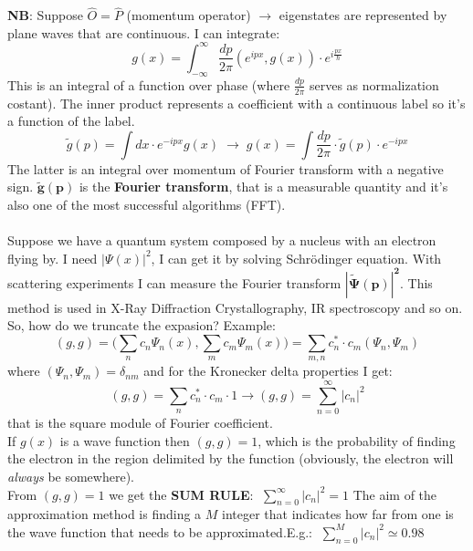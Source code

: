 \textbf{NB}: Suppose $\hat{O}=\hat{P}$ (momentum operator) $\rightarrow$ eigenstates are represented by plane waves that are continuous. I can integrate:\\
\[
g(x)=\int_{-\infty}^{\infty}\frac{dp}{2\pi}(e^{ipx},g(x))\cdot e^{i\frac{px}{\hbar}}
\]
This is an integral of a function over phase (where $\frac{dp}{2\pi}$ serves as normalization costant). The inner product represents a coefficient with a continuous label so it's a function of the label.
\[
\tilde{g}(p)=\int dx\cdot e^{-ipx}g(x)\; \rightarrow \; g(x)=\int \frac{dp}{2\pi} \cdot \tilde{g}(p) \cdot e^{-ipx}
\]
The latter is an integral over momentum of Fourier transform with a negative sign.
$\mathbf{\tilde{g}(p)}$ is the \textbf{Fourier transform}, that is a measurable quantity and it's also one of the most successful algorithms (FFT).\\
\\
Suppose we have a quantum system composed by a nucleus with an electron flying by. I need $|\Psi(x)|^2$, I can get it by solving Schr{\"o}dinger equation. With scattering experiments I can measure the Fourier transform $\mathbf{|\tilde{\Psi}(p)|^2}$. This method is used in X-Ray Diffraction Crystallography, IR spectroscopy and so on.
\newline
So, how do we truncate the expasion? Example:
\[
(g,g)=\biggl(\sum_nc_n\Psi_n(x), \sum_mc_m\Psi_m(x)\biggr) = \sum_{m,n}c_n^*\cdot c_m(\Psi_n, \Psi_m)
\]
where $(\Psi_n,\Psi_m)=\delta_{nm}$ and for the Kronecker delta properties I get:
\[
(g,g)= \sum_nc_n^* \cdot c_m \cdot 1 \rightarrow (g,g)=\sum_{n=0}^{\infty}|c_n|^2
\]
that is the square module of Fourier coefficient.\\
If $g(x)$ is a wave function then $(g,g)=1$, which is the probability of finding the electron in the region delimited by the function (obviously, the electron will \textit{always} be somewhere).\\
\newline
From $(g,g)=1$ we get the \textbf{SUM RULE}: $\; \sum_{n=0}^{\infty}|c_n|^2=1$
The aim of the approximation method is finding a $M$ integer that indicates how far from one is the wave function that needs to be approximated.E.g.: $\; \sum_{n=0}^{M}|c_n|^2 \simeq 0.98$\\

\noindent
